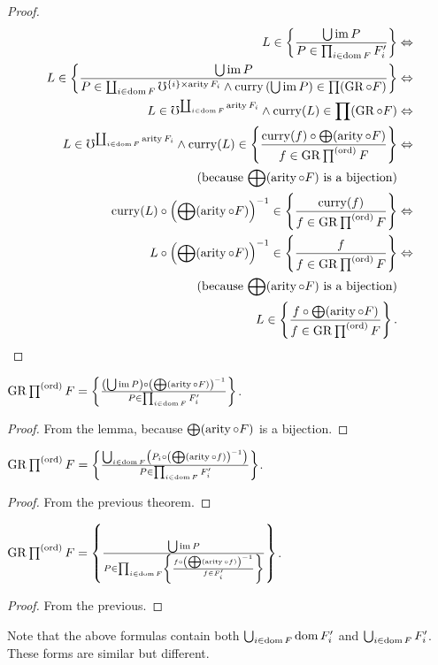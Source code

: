 \begin{proof}
~
\begin{align*}
L\in\left\{ \frac{\bigcup\operatorname{im} P}{P\in\prod_{i\in\operatorname{dom} F}F'_{i}}\right\} & \Leftrightarrow\\
L\in\left\{ \frac{\bigcup\operatorname{im} P}{P\in\coprod_{i\in\operatorname{dom} F}\mho^{\{i\}\times\operatorname{arity} F_{i}}\land\operatorname{curry}\left(\bigcup\operatorname{im} P\right)\in\prod(\operatorname{GR}\circ F)}\right\} & \Leftrightarrow\\
L\in\mho^{\coprod_{i\in\operatorname{dom} F}\operatorname{arity} F_{i}}\land\operatorname{curry}(L)\in\prod(\operatorname{GR}\circ F) & \Leftrightarrow\\
L\in\mho^{\coprod_{i\in\operatorname{dom} F}\operatorname{arity} F_{i}}\land\operatorname{curry}(L)\in\left\{ \frac{\operatorname{curry}(f)\circ\bigoplus(\operatorname{arity}\circ F)}{f\in\operatorname{GR}\prod^{\mathrm{(ord)}}F}\right\} & \Leftrightarrow\\
\text{(because \ensuremath{\bigoplus(\operatorname{arity}\circ F)} is a bijection)}\\
\operatorname{curry}(L)\circ\left(\bigoplus(\operatorname{arity}\circ F)\right)^{-1}\in\left\{ \frac{\operatorname{curry}(f)}{f\in\operatorname{GR}\prod^{\mathrm{(ord)}}F}\right\} & \Leftrightarrow\\
L\circ\left(\bigoplus(\operatorname{arity}\circ F)\right)^{-1}\in\left\{ \frac{f}{f\in\operatorname{GR}\prod^{\mathrm{(ord)}}F}\right\} & \Leftrightarrow\\
\text{(because \ensuremath{\bigoplus(\operatorname{arity}\circ F)} is a bijection)}\\
L\in\left\{ \frac{f\circ\bigoplus(\operatorname{arity}\circ F)}{f\in\operatorname{GR}\prod^{\mathrm{(ord)}}F}\right\}.
\end{align*}
\end{proof}
\begin{thm}
$\operatorname{GR}\prod^{\mathrm{(ord)}}F=\left\{ \frac{\left(\bigcup\operatorname{im} P\right)\circ\left(\bigoplus(\operatorname{arity}\circ F)\right)^{-1}}{P\in\prod_{i\in\operatorname{dom} F}F'_{i}}\right\}$.\end{thm}
\begin{proof}
From the lemma, because $\bigoplus(\operatorname{arity}\circ F)$ is a bijection.\end{proof}
\begin{thm}
$\operatorname{GR}\prod^{\mathrm{(ord)}}F=\left\{ \frac{\bigcup_{i\in\operatorname{dom} F}\left(P_{i}\circ\left(\bigoplus(\operatorname{arity}\circ f)\right)^{-1}\right)}{P\in\prod_{i\in\operatorname{dom} F}F'_{i}}\right\}$.\end{thm}
\begin{proof}
From the previous theorem.\end{proof}
\begin{thm}
$\operatorname{GR}\prod^{\mathrm{(ord)}}F=\left\{ \frac{\bigcup\operatorname{im} P}{P\in\prod_{i\in\operatorname{dom} F}\left\{ \frac{f\circ\left(\bigoplus(\operatorname{arity}\circ f)\right)^{-1}}{f\in F'_{i}}\right\}}\right\}$.\end{thm}
\begin{proof}
From the previous.\end{proof}
\begin{rem}
Note that the above formulas contain both $\bigcup_{i\in\operatorname{dom} F}\operatorname{dom} F'_{i}$
and $\bigcup_{i\in\operatorname{dom} F}F'_{i}$. These forms are similar but different.
\end{rem}

